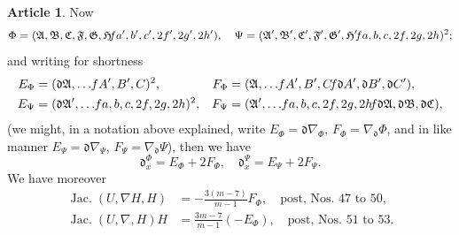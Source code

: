 \documentclass[12pt,a4paper]{article}
\theoremstyle{definition}
\newtheorem{art}{Article}[section]
\DeclareMathOperator{\Jac}{Jac.}
\begin{document}
\begin{art}
Now
\[
\Phi = (\mathfrak{A}, \mathfrak{B}, \mathfrak{C}, \mathfrak{F}, \mathfrak{G}, \mathfrak{H} \hspace{-2pt} fa', b', c', 2f', 2g', 2h'), \quad \Psi = (\mathfrak{A}', \mathfrak{B}', \mathfrak{C}', \mathfrak{F}', \mathfrak{G}', \mathfrak{H}' \hspace{-2pt} fa, b, c, 2f, 2g, 2h)^2;
\]
and writing for shortness
\begin{align*}
E_\Phi &= (\mathfrak{d}\mathfrak{A}, \ldots \hspace{-2pt} fA', B', C)^2, & F_\Phi &= (\mathfrak{A}, \ldots \hspace{-2pt} fA', B', C \hspace{-2pt} f\mathfrak{d}A', \mathfrak{d}B', \mathfrak{d}C'), \\
E_\Psi &= (\mathfrak{d}\mathfrak{A}', \ldots \hspace{-2pt} fa, b, c, 2f, 2g, 2h)^2, & F_\Psi &= (\mathfrak{A}', \ldots \hspace{-2pt} fa, b, c, 2f, 2g, 2h \hspace{-2pt} f\mathfrak{d}\mathfrak{A}, \mathfrak{d}\mathfrak{B}, \mathfrak{d}\mathfrak{C}),
\end{align*}
(we might, in a notation above explained, write $E_\Phi = \mathfrak{d}\nabla_\Phi$, $F_\Phi = \nabla_\mathfrak{d}\Phi$, and in like manner $E_\Psi = \mathfrak{d}\nabla_\Psi$, $F_\Psi = \nabla_\mathfrak{d}\Psi$), then we have
\[
\mathfrak{d}_x^\Phi = E_\Phi + 2F_\Phi, \quad \mathfrak{d}_x^\Psi = E_\Psi + 2F_\Psi.
\]
We have moreover
\begin{align*}
\Jac(U, \nabla H, H) &= -\frac{3(m - 7)}{m - 1}F_\Phi, \quad \text{post, Nos.\ 47 to 50}, \\
\Jac(U, \nabla, H)H &= \frac{3m - 7}{m - 1}(-E_\Phi), \quad \text{post, Nos.\ 51 to 53}.
\end{align*}
\end{art}
\end{document}
